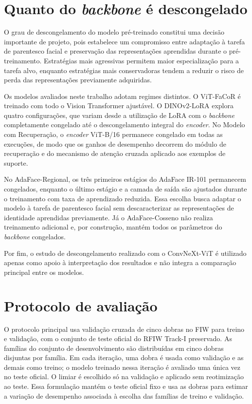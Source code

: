 \section{Quanto do \textit{backbone} é descongelado}

O grau de descongelamento do modelo pré-treinado constitui uma decisão importante de projeto, pois estabelece um compromisso entre adaptação à tarefa de parentesco facial e preservação das representações aprendidas durante o pré-treinamento. Estratégias mais agressivas permitem maior especialização para a tarefa alvo, enquanto estratégias mais conservadoras tendem a reduzir o risco de perda das representações previamente adquiridas.

Os modelos avaliados neste trabalho adotam regimes distintos. O ViT-FaCoR é treinado com todo o Vision Transformer ajustável. O DINOv2-LoRA explora quatro configurações, que variam desde a utilização de LoRA com o \textit{backbone} completamente congelado até o descongelamento integral do \textit{encoder}. No Modelo com Recuperação, o \textit{encoder} ViT-B/16 permanece congelado em todas as execuções, de modo que os ganhos de desempenho decorrem do módulo de recuperação e do mecanismo de atenção cruzada aplicado aos exemplos de suporte.

No AdaFace-Regional, os três primeiros estágios do AdaFace IR-101 permanecem congelados, enquanto o último estágio e a camada de saída são ajustados durante o treinamento com taxa de aprendizado reduzida. Essa escolha busca adaptar o modelo à tarefa de parentesco facial sem descaracterizar as representações de identidade aprendidas previamente. Já o AdaFace-Cosseno não realiza treinamento adicional e, por construção, mantém todos os parâmetros do \textit{backbone} congelados.

Por fim, o estudo de descongelamento realizado com o ConvNeXt-ViT é utilizado apenas como apoio à interpretação dos resultados e não integra a comparação principal entre os modelos.

\section{Protocolo de avaliação}

O protocolo principal usa validação cruzada de cinco dobras no FIW para treino e validação, com o conjunto de teste oficial do RFIW Track-I preservado. As famílias do conjunto de desenvolvimento são distribuídas em cinco dobras disjuntas por família. Em cada iteração, uma dobra é usada como validação e as demais como treino; o modelo treinado nessa iteração é avaliado uma única vez no teste oficial. O limiar é escolhido só na validação e aplicado sem reotimização ao teste. Essa formulação mantém o teste oficial fixo e usa as dobras para estimar a variação de desempenho associada à escolha das famílias de treino e validação.

